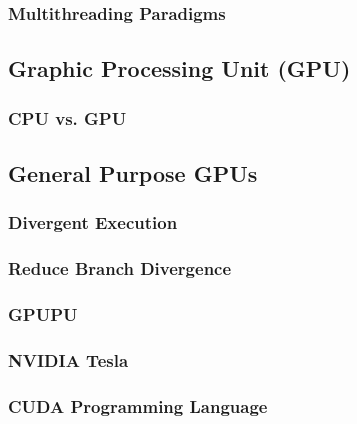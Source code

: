 \documentclass[titlepage, a4paper]{article}
\begin{document}
\subsubsection{Multithreading Paradigms}
\subsection{Graphic Processing Unit (GPU)}
\subsubsection{CPU vs. GPU}
\subsection{General Purpose GPUs}
\subsubsection{Divergent Execution}
\subsubsection{Reduce Branch Divergence}
\subsubsection{GPUPU}
\subsubsection{NVIDIA Tesla}
\subsubsection{CUDA Programming Language}
\end{document}
